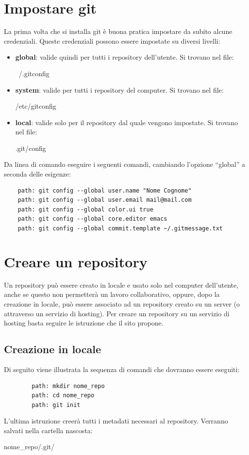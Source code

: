 \section{Impostare git} %
\label{sec:impostare_git}
La prima volta che si installa git è buona pratica impostare da subito alcune credenziali. \newline
Queste credenziali possono essere impostate su diversi livelli:
	\begin{itemize}
		\item \textbf{global}: valide quindi per tutti i repository dell'utente. Si trovano nel file:
			\begin{center}
				~/.gitconfig
			\end{center}
		\item \textbf{system}: valide per tutti i repository del computer. Si trovano nel file:
			\begin{center}
				/etc/gitconfig
			\end{center}
		\item \textbf{local}: valide solo per il repository dal quale vengono impostate. Si trovano nel file:
			\begin{center}
				.git/config
			\end{center}
	\end{itemize}
Da linea di comando eseguire i seguenti comandi, cambiando l'opzione ``global'' a seconda delle esigenze:
	\begin{verbatim}
	path: git config --global user.name "Nome Cognome"
	path: git config --global user.email mail@mail.com
	path: git config --global color.ui true
	path: git config --global core.editor emacs
	path: git config --global commit.template ~/.gitmessage.txt
	\end{verbatim}


\newpage \clearpage
\section{Creare un repository} %
\label{sec:creare_un_repository}
Un repository può essere creato in locale e usato solo nel computer dell'utente, anche se questo non permetterà un lavoro collaborativo, oppure, dopo la creazione in locale, può essere associato ad un repository creato su un server (o attraverso un servizio di hosting). \newline
Per creare un repository su un servizio di hosting basta seguire le istruzione che il sito propone.
	\subsection{Creazione in locale} %
	\label{sub:creazione_in_locale}
	Di seguito viene illustrata la sequenza di comandi che dovranno essere eseguiti:
		\begin{verbatim}
		path: mkdir nome_repo
		path: cd nome_repo
		path: git init
		\end{verbatim}
	\noindent
	L'ultima istruzione creerà tutti i metadati necessari al repository. Verranno salvati nella cartella nascosta:
		\begin{center}
			nome\_repo/.git/
		\end{center}

